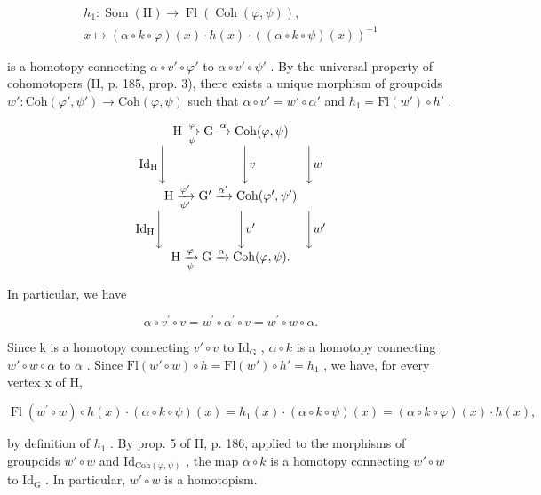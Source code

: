 \[
\begin{array}{c} h _ {1} \colon \operatorname{Som} (\mathrm{H}) \to \operatorname{Fl} (\operatorname{Coh} (\varphi , \psi)), \\ x \mapsto (\alpha \circ k \circ \varphi) (x) \cdot h (x) \cdot ((\alpha \circ k \circ \psi) (x)) ^ {- 1} \end{array}
\]

is a homotopy connecting \(\alpha \circ v' \circ \varphi'\) to \(\alpha \circ v' \circ \psi'\) . By the universal property of cohomotopers (II, p. 185, prop. 3), there exists a unique morphism of groupoids \(w'\colon \mathrm{Coh}(\varphi', \psi') \to \mathrm{Coh}(\varphi, \psi)\) such that \(\alpha \circ v' = w' \circ \alpha'\) and \(h_1 = \mathrm{Fl}(w') \circ h'\) .

\[
\begin{array}{c} \mathrm{H} \xrightarrow [ \psi ]{\varphi} \mathrm{G} \xrightarrow {\alpha} \mathrm{Coh} (\varphi , \psi) \\ \mathrm{Id} _ {\mathrm{H}} \Biggl \downarrow \qquad \qquad \qquad \Biggl \downarrow v \qquad \qquad \Biggl \downarrow w \\ \mathrm{H} \xrightarrow [ \psi^ {\prime} ]{\varphi^ {\prime}} \mathrm{G} ^ {\prime} \xrightarrow {\alpha^ {\prime}} \mathrm{Coh} (\varphi^ {\prime}, \psi^ {\prime}) \\ \mathrm{Id} _ {\mathrm{H}} \Biggl \downarrow \qquad \qquad \qquad \Biggl \downarrow v ^ {\prime} \qquad \qquad \Biggl \downarrow w ^ {\prime} \\ \mathrm{H} \xrightarrow [ \psi ]{\varphi} \mathrm{G} \xrightarrow {\alpha} \mathrm{Coh} (\varphi , \psi)  . \end{array}
\]

In particular, we have

\[
\alpha \circ v ^ {\prime} \circ v = w ^ {\prime} \circ \alpha^ {\prime} \circ v = w ^ {\prime} \circ w \circ \alpha .
\]

Since k is a homotopy connecting \(v'\circ v\) to \(\mathrm{Id}_{\mathrm{G}}\) , \(\alpha\circ k\) is a homotopy connecting \(w'\circ w\circ\alpha\) to \(\alpha\) . Since \(\mathrm{Fl}(w'\circ w)\circ h=\mathrm{Fl}(w')\circ h'=h_{1}\) , we have, for every vertex x of H,

\[
\operatorname{Fl} \left(w ^ {\prime} \circ w\right) \circ h (x) \cdot (\alpha \circ k \circ \psi) (x) = h _ {1} (x) \cdot (\alpha \circ k \circ \psi) (x) = (\alpha \circ k \circ \varphi) (x) \cdot h (x),
\]

by definition of \(h_1\) . By prop. 5 of II, p. 186, applied to the morphisms of groupoids \(w' \circ w\) and \(\mathrm{Id}_{\mathrm{Coh}(\varphi, \psi)}\) , the map \(\alpha \circ k\) is a homotopy connecting \(w' \circ w\) to \(\mathrm{Id}_{\mathrm{G}}\) . In particular, \(w' \circ w\) is a homotopism.

